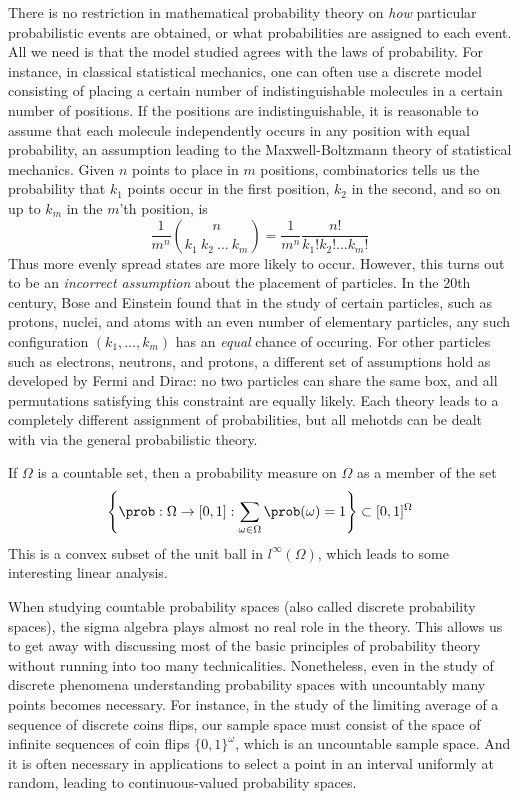 There is no restriction in mathematical probability theory on {\it how} particular probabilistic events are obtained, or what probabilities are assigned to each event. All we need is that the model studied agrees with the laws of probability. For instance, in classical statistical mechanics, one can often use a discrete model consisting of placing a certain number of indistinguishable molecules in a certain number of positions. If the positions are indistinguishable, it is reasonable to assume that each molecule independently occurs in any position with equal probability, an assumption leading to the Maxwell-Boltzmann theory of statistical mechanics. Given $n$ points to place in $m$ positions, combinatorics tells us the probability that $k_1$ points occur in the first position, $k_2$ in the second, and so on up to $k_m$ in the $m$'th position, is
%
\[ \frac{1}{m^n} {n \choose k_1\ k_2\ \dots\ k_m} = \frac{1}{m^n} \frac{n!}{k_1! k_2! \dots k_m!} \]
%
Thus more evenly spread states are more likely to occur. However, this turns out to be an \emph{incorrect assumption} about the placement of particles. In the 20th century, Bose and Einstein found that in the study of certain particles, such as protons, nuclei, and atoms with an even number of elementary particles, any such configuration $(k_1, \dots, k_m)$ has an {\it equal} chance of occuring. For other particles such as electrons, neutrons, and protons, a different set of assumptions hold as developed by Fermi and Dirac: no two particles can share the same box, and all permutations satisfying this constraint are equally likely. Each theory leads to a completely different assignment of probabilities, but all mehotds can be dealt with via the general probabilistic theory.

\begin{example}
    If $\Omega$ is a countable set, then a probability measure on $\Omega$ as a member of the set
    \[ \left\{ \prob: \Omega \to [0,1]: \sum_{\omega \in \Omega} \prob(\omega) = 1 \right\} \subset [0,1]^\Omega \]
    This is a convex subset of the unit ball in $l^\infty(\Omega)$, which leads to some interesting linear analysis.
\end{example}

When studying countable probability spaces (also called discrete probability spaces), the sigma algebra plays almost no real role in the theory. This allows us to get away with discussing most of the basic principles of probability theory without running into too many technicalities. Nonetheless, even in the study of discrete phenomena understanding probability spaces with uncountably many points becomes necessary. For instance, in the study of the limiting average of a sequence of discrete coins flips, our sample space must consist of the space of infinite sequences of coin flips $\{ 0, 1 \}^\omega$, which is an uncountable sample space. And it is often necessary in applications to select a point in an interval uniformly at random, leading to continuous-valued probability spaces.


